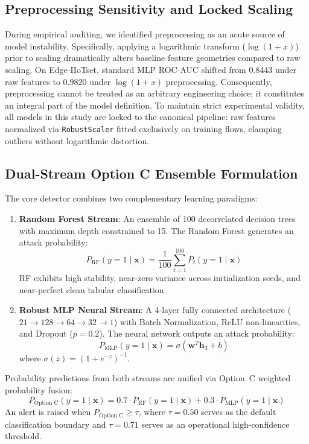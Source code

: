 \documentclass[10pt,journal,compsoc,twocolumn]{IEEEtran}
\begin{document}
\subsection{Preprocessing Sensitivity and Locked Scaling}
During empirical auditing, we identified preprocessing as an acute source of model instability. Specifically, applying a logarithmic transform ($\log(1+x)$) prior to scaling dramatically alters baseline feature geometries compared to raw scaling. On Edge-IIoTset, standard MLP ROC-AUC shifted from $0.8443$ under raw features to $0.9820$ under $\log(1+x)$ preprocessing. Consequently, preprocessing cannot be treated as an arbitrary engineering choice; it constitutes an integral part of the model definition. To maintain strict experimental validity, all models in this study are locked to the canonical pipeline: raw features normalized via \texttt{RobustScaler} fitted exclusively on training flows, clamping outliers without logarithmic distortion.

\subsection{Dual-Stream Option C Ensemble Formulation}
The core detector combines two complementary learning paradigms:
\begin{enumerate}
    \item \textbf{Random Forest Stream}: An ensemble of 100 decorrelated decision trees~\cite{breiman2001random} with maximum depth constrained to 15. The Random Forest generates an attack probability:
    \begin{equation}
    P_{\text{RF}}(y=1 \mid \mathbf{x}) = \frac{1}{100} \sum_{t=1}^{100} P_t(y=1 \mid \mathbf{x})
    \end{equation}
    RF exhibits high stability, near-zero variance across initialization seeds, and near-perfect clean tabular classification.
    \item \textbf{Robust MLP Neural Stream}: A 4-layer fully connected architecture ($21 \to 128 \to 64 \to 32 \to 1$) with Batch Normalization, ReLU non-linearities, and Dropout ($p=0.2$). The neural network outputs an attack probability:
    \begin{equation}
    P_{\text{MLP}}(y=1 \mid \mathbf{x}) = \sigma(\mathbf{w}^T \mathbf{h}_3 + b)
    \end{equation}
    where $\sigma(z) = (1 + e^{-z})^{-1}$.
\end{enumerate}

Probability predictions from both streams are unified via Option~C weighted probability fusion:
\begin{equation}
P_{\text{Option C}}(y=1 \mid \mathbf{x}) = 0.7 \cdot P_{\text{RF}}(y=1 \mid \mathbf{x}) + 0.3 \cdot P_{\text{MLP}}(y=1 \mid \mathbf{x})
\label{eq:option_c_fusion}
\end{equation}
An alert is raised when $P_{\text{Option C}} \ge \tau$, where $\tau = 0.50$ serves as the default classification boundary and $\tau = 0.71$ serves as an operational high-confidence threshold.
\end{document}
